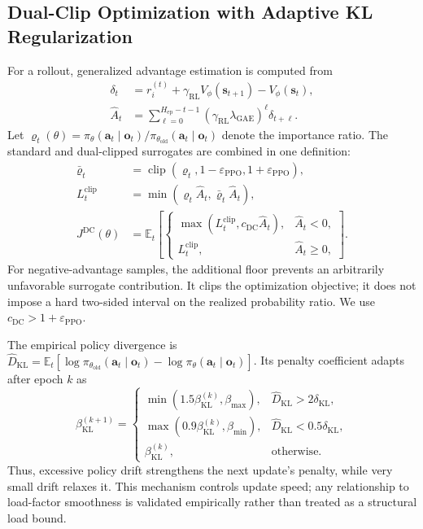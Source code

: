 \subsection{Dual-Clip Optimization with Adaptive KL Regularization}
\label{subsec:dual_clip_kl}

For a rollout, generalized advantage estimation is computed from
\begin{equation}
\label{eq:gae}
\begin{aligned}
\delta_t&=r_i^{(t)}+\gamma_{\mathrm{RL}}V_{\phi}(\mathbf s_{t+1})
-V_{\phi}(\mathbf s_t),\\
\widehat A_t&=\sum_{\ell=0}^{H_{\mathrm{ep}}-t-1}
(\gamma_{\mathrm{RL}}\lambda_{\mathrm{GAE}})^{\ell}\delta_{t+\ell}.
\end{aligned}
\end{equation}
Let $\varrho_t(\theta)=\pi_{\theta}(\mathbf a_t\mid\mathbf o_t)/
\pi_{\theta_{\mathrm{old}}}(\mathbf a_t\mid\mathbf o_t)$ denote the importance ratio. The
standard and dual-clipped surrogates are combined in one definition:
\begin{equation}
\label{eq:dual_clip}
\begin{aligned}
\bar\varrho_t&=\operatorname{clip}
(\varrho_t,1-\varepsilon_{\mathrm{PPO}},1+\varepsilon_{\mathrm{PPO}}),\\
L_t^{\mathrm{clip}}&=\min(\varrho_t\widehat A_t,
\bar\varrho_t\widehat A_t),\\
J^{\mathrm{DC}}(\theta)&=\mathbb E_t\!\left[
\begin{cases}
\max(L_t^{\mathrm{clip}},c_{\mathrm{DC}}\widehat A_t),&\widehat A_t<0,\\
L_t^{\mathrm{clip}},&\widehat A_t\geq0,
\end{cases}\right].
\end{aligned}
\end{equation}
For negative-advantage samples, the additional floor prevents an arbitrarily unfavorable
surrogate contribution. It clips the optimization objective; it does not impose a hard
two-sided interval on the realized probability ratio. We use
$c_{\mathrm{DC}}>1+\varepsilon_{\mathrm{PPO}}$.

The empirical policy divergence is
$\widehat D_{\mathrm{KL}}=\mathbb E_t[\log\pi_{\theta_{\mathrm{old}}}
(\mathbf a_t\mid\mathbf o_t)-\log\pi_{\theta}(\mathbf a_t\mid\mathbf o_t)]$. Its penalty
coefficient adapts after epoch $k$ as
\begin{equation}
\label{eq:kl_adaptation}
\beta_{\mathrm{KL}}^{(k+1)}=
\begin{cases}
\min(1.5\beta_{\mathrm{KL}}^{(k)},\beta_{\max}),
&\widehat D_{\mathrm{KL}}>2\delta_{\mathrm{KL}},\\
\max(0.9\beta_{\mathrm{KL}}^{(k)},\beta_{\min}),
&\widehat D_{\mathrm{KL}}<0.5\delta_{\mathrm{KL}},\\
\beta_{\mathrm{KL}}^{(k)},&\text{otherwise}.
\end{cases}
\end{equation}
Thus, excessive policy drift strengthens the next update's penalty, while very small drift
relaxes it. This mechanism controls update speed; any relationship to load-factor smoothness is
validated empirically rather than treated as a structural load bound.

